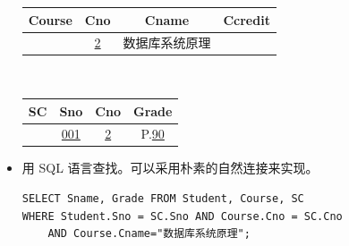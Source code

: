 \documentclass[UTF8]{ctexart}
\begin{document}
\begin{itemize}
\begin{table}[H]
    \begin{tabular}{|c|c|c|c|}
        \hline
        Course & Cno & Cname & Ccredit \\
        \hline
                & \uline{2} & 数据库系统原理 & \\
        \hline
    \end{tabular}\\
    
    \begin{tabular}{|c|c|c|c|}
        \hline
        SC & Sno & Cno & Grade \\
        \hline
           & \uline{001} & \uline{2} & P.\uline{90} \\
        \hline
    \end{tabular}
    \end{table}
    
    \item 用 SQL 语言查找。可以采用朴素的自然连接来实现。
\begin{lstlisting}
SELECT Sname, Grade FROM Student, Course, SC
WHERE Student.Sno = SC.Sno AND Course.Cno = SC.Cno 
    AND Course.Cname="数据库系统原理";
\end{lstlisting}
\end{itemize}

\BgThispage
\end{document}
